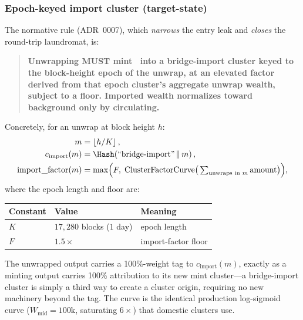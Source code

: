 \subsubsection{Epoch-keyed import cluster (target-state)}

The normative rule (ADR~0007), which \emph{narrows} the entry leak and
\emph{closes} the round-trip laundromat, is:

\begin{quote}
\textbf{Unwrapping MUST mint \BTH\ into a bridge-import cluster keyed to the
block-height epoch of the unwrap, at an elevated factor derived from that epoch
cluster's aggregate unwrap wealth, subject to a floor. Imported wealth
normalizes toward background only by circulating.}
\end{quote}

Concretely, for an unwrap at block height $h$:
\begin{align}
m &= \left\lfloor h / K \right\rfloor, \label{eq:bridge:epoch}\\
c_{\mathrm{import}}(m) &= \Hash\!\left(\text{``bridge-import''} \,\|\, m\right), \label{eq:bridge:cluster}\\
\mathrm{import\_factor}(m) &= \max\!\Big(F,\; \mathrm{ClusterFactorCurve}\big(\textstyle\sum_{\text{unwraps in }m} \mathrm{amount}\big)\Big), \label{eq:bridge:importfactor}
\end{align}
where the epoch length and floor are:
\begin{center}
\begin{tabular}{lll}
\toprule
\textbf{Constant} & \textbf{Value} & \textbf{Meaning} \\
\midrule
$K$ & $17{,}280$ blocks ($1$ day) & epoch length \\ %
$F$ & $1.5\times$ & import-factor floor \\ %
\bottomrule
\end{tabular}
\end{center}

The unwrapped output carries a 100\%-weight tag to $c_{\mathrm{import}}(m)$,
exactly as a minting output carries 100\% attribution to its new mint
cluster---a bridge-import cluster is simply a third way to create a cluster
origin, requiring no new machinery beyond the tag. The curve is the identical
production log-sigmoid curve ($W_{\mathrm{mid}} = 100\text{k}$, saturating
$6\times$) that domestic clusters use.

